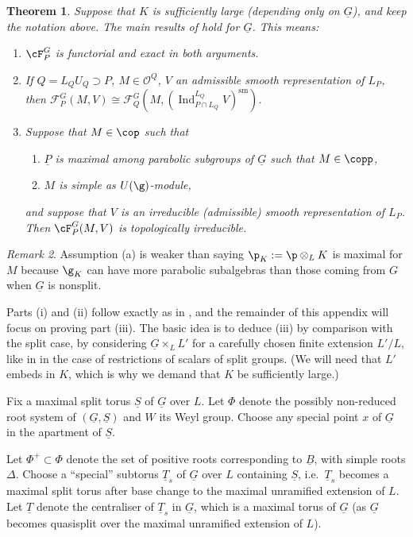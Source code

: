\documentclass[a4paper]{amsart}
\numberwithin{equation}{section}
\newtheorem{thm}{Theorem}[section]
\theoremstyle{remark}
\newtheorem{remark}[thm]{Remark}
\theoremstyle{definition}
\DeclareMathOperator{\Ind}{Ind}
\newcommand{\sm}{\mathrm{sm}}
\newcommand{\alggrp}[1]{\underline{#1}}
\renewcommand{\simeq}{\cong}
\begin{document}
\begin{thm}\label{thm:OS-main}
  Suppose that $K$ is sufficiently large (depending only on $\alggrp G$), and keep the notation above.
  The main results of \cite{OS3} hold for $\alggrp G$. This means:
  \begin{enumerate}
  \item $\cF_P^G$ is functorial and exact in both arguments.
  \item If $Q = L_Q U_Q \supset P$, $M \in \mathcal{O}^{Q}$, $V$ an admissible smooth representation of $L_P$, then
    $\mathcal{F}_{P}^{G}(M,V)\simeq \mathcal{F}_{Q}^{G}(M,(\Ind_{P \cap L_{Q}}^{L_{Q}}V)^{\sm})$.
  \item Suppose that $M \in \cop$ such that 
    \begin{enumerate}
    \item $\alggrp P$ is maximal among parabolic subgroups of $\alggrp G$ such that $M \in \copp$,
    \item $M$ is simple as $U(\g)$-module,
    \end{enumerate}
    and suppose that $V$ is an irreducible (admissible) smooth representation of $L_P$. Then $\cF_P^G(M,V)$ is topologically irreducible.
  \end{enumerate}
\end{thm}

\begin{remark}
  Assumption (a) is weaker than saying $\p_K := \p \otimes_L K$ is maximal for $M$ because $\g_K$ can have more parabolic subalgebras than those
  coming from $G$ when $\alggrp G$ is nonsplit.
\end{remark}

Parts (i) and (ii) follow exactly as in \cite{OS2}, \cite{OS3} and the remainder of this appendix will focus on proving part (iii).
The basic idea is to deduce (iii) by comparison with the split case, by considering $\alggrp G \times_L L'$ for a carefully chosen finite extension $L'/L$, like in \cite[Appendice]{socle1} in the case of restrictions of scalars of split groups.
(We will need that $L'$ embeds in $K$, which is why we demand that $K$ be sufficiently large.)

Fix a maximal split torus $\alggrp S$ of $\alggrp G$ over $L$. Let $\Phi$ denote the possibly non-reduced root system of $(\alggrp G, \alggrp S)$ and $W$ its Weyl group.
Choose any special point $x$ of $\alggrp G$ in the apartment of $\alggrp S$.

Let $\Phi^+ \subset \Phi$ denote the set of positive roots corresponding to $\alggrp B$, with simple roots $\Delta$.
Choose a ``special'' subtorus $\alggrp T_s$ of $\alggrp G$ over $L$ containing $\alggrp S$, i.e.\ $\alggrp T_s$ becomes a maximal split torus after base change to the
maximal unramified extension of $L$. Let $\alggrp T$ denote the centraliser of $\alggrp T_s$ in $\alggrp G$, which is a maximal torus of $\alggrp G$ (as $\alggrp G$ becomes quasisplit
over the maximal unramified extension of $L$).
\end{document}
